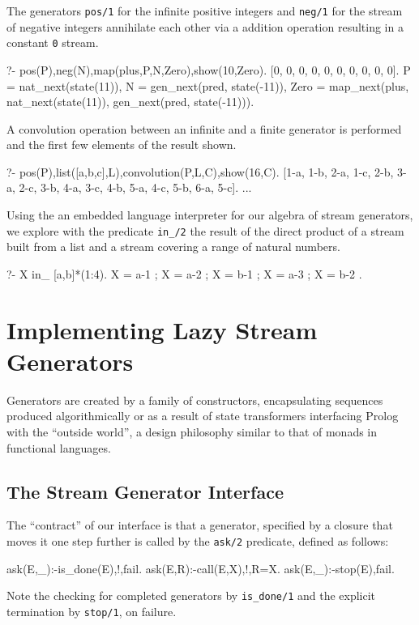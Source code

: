 \documentclass{new_tlp}
\begin{document}
\BX
The generators {\tt pos/1} for the infinite positive integers and {\tt neg/1} for
the stream of negative integers annihilate each other via a addition operation
resulting in a constant {\tt 0} stream.
\begin{codex}
?- pos(P),neg(N),map(plus,P,N,Zero),show(10,Zero).
[0, 0, 0, 0, 0, 0, 0, 0, 0, 0].
P = nat_next(state(11)), N = gen_next(pred, state(-11)),
Zero = map_next(plus, nat_next(state(11)), gen_next(pred, state(-11))).
\end{codex}
\EX

\BX
A convolution operation between an infinite and a finite generator is performed
and the first few elements of the result shown.
\begin{codex}
?- pos(P),list([a,b,c],L),convolution(P,L,C),show(16,C).
[1-a, 1-b, 2-a, 1-c, 2-b, 3-a, 2-c, 3-b, 4-a, 3-c, 4-b, 5-a, 4-c, 5-b, 6-a, 5-c].
...
\end{codex}
\EX

\BX
Using the an embedded language interpreter for our algebra of stream
generators, we explore with the predicate {\tt in\_/2} 
the result of the direct product of a stream built
from a list and a stream covering a range of natural numbers.

\begin{codex}
?- X in_ [a,b]*(1:4).
X = a-1 ;
X = a-2 ;
X = b-1 ;
X = a-3 ;
X = b-2 .
\end{codex}
\EX  
     

\section{Implementing Lazy Stream Generators}
  
Generators are created by a family of constructors, encapsulating sequences produced algorithmically or as a result of state transformers interfacing Prolog with the ``outside world'', a design philosophy similar to that of monads in functional languages.

\subsection{The Stream Generator Interface}

The ``contract'' of our interface is that a generator, specified by a 
closure that moves it one step further is called by the {\tt ask/2} predicate, defined as follows:
\begin{code}
ask(E,_):-is_done(E),!,fail.
ask(E,R):-call(E,X),!,R=X.
ask(E,_):-stop(E),fail.
\end{code}
Note  the checking for completed generators by {\tt is\_done/1} and the explicit termination by {\tt stop/1}, on failure.
\end{document}
